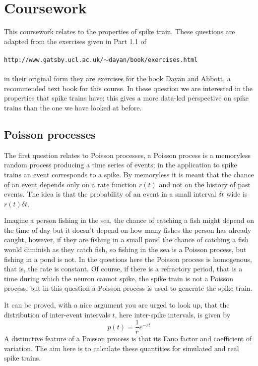 \documentclass[12pt]{article}
\begin{document}
\section*{Coursework}

This coursework relates to the properties of spike train. These
questions are adapted from the exercises given in Part 1.1 of\\
\\
\texttt{http://www.gatsby.ucl.ac.uk/$\sim$dayan/book/exercises.html}\\
\\
in their original form they are exercises for the book Dayan and
Abbott, a recommended text book for this course. In these question we
are interested in the properties that spike trains have; this gives a
more data-led perspective on spike trains than the one we have looked
at before.

\subsection*{Poisson processes}

The first question relates to Poisson processes, a Poisson process
is a memoryless random process producing a time series of events; in
the application to spike trains an event corresponds to a spike. By
memoryless it is meant that the chance of an event depends only on a
rate function $r(t)$ and not on the history of past events. The idea
is that the probability of an event in a small interval $\delta t$ wide is $r(t)\delta t$.

Imagine a person fishing in the sea, the chance of catching a fish
might depend on the time of day but it doesn't depend on how many
fishes the person has already caught, however, if they are fishing in
a small pond the chance of catching a fish would diminish as they
catch fish, so fishing in the sea is a Poisson process, but fishing in
a pond is not. In the questions here the Poisson process is
homogenous, that is, the rate is constant. Of course, if there is a
refractory period, that is a time during which the neuron cannot
spike, the spike train is not a Poisson process, but in this question
a Poisson process is used to generate the spike train.

It can be proved, with a nice argument you are urged to look up, that
the distribution of inter-event intervals $t$, here inter-spike intervals,
is given by
\begin{equation}
p(t)=\frac{1}{r}e^{-rt}
\end{equation}
A distinctive feature of a Poisson process is that its Fano factor and
coefficient of variation. The aim here is to calculate these
quantities for simulated and real spike trains.
\end{document}
